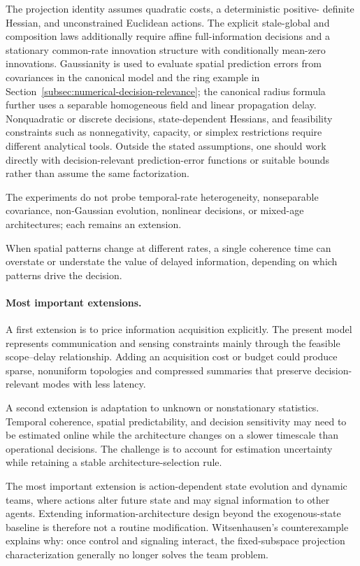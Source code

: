 \documentclass[11pt]{article}
\begin{document}
The projection identity assumes quadratic costs, a deterministic positive-
definite Hessian, and unconstrained Euclidean actions. The explicit stale-global
and composition laws additionally require affine full-information decisions
and a stationary common-rate innovation structure with conditionally
mean-zero innovations. Gaussianity is used to evaluate spatial prediction
errors from covariances in the canonical model and the ring example in
Section~\ref{subsec:numerical-decision-relevance};
the canonical radius formula further uses a separable homogeneous field
and linear propagation delay.
Nonquadratic or discrete decisions, state-dependent Hessians, and feasibility
constraints such as nonnegativity, capacity, or simplex restrictions require
different analytical tools. Outside the stated assumptions, one should work
directly with decision-relevant prediction-error functions or suitable bounds
rather than assume the same factorization.

The experiments do not probe temporal-rate heterogeneity, nonseparable
covariance, non-Gaussian evolution, nonlinear decisions, or mixed-age
architectures; each remains an extension.

When spatial patterns change at different rates, a single coherence time can
overstate or understate the value of delayed information, depending on which
patterns drive the decision.

\paragraph{Most important extensions.}
A first extension is to price information acquisition explicitly. The present
model represents communication and sensing constraints mainly through the
feasible scope--delay relationship. Adding an acquisition cost or budget could
produce sparse, nonuniform topologies and compressed summaries that preserve
decision-relevant modes with less latency.

A second extension is adaptation to unknown or nonstationary statistics.
Temporal coherence, spatial predictability, and decision sensitivity may need
to be estimated online while the architecture changes on a slower timescale
than operational decisions. The challenge is to account for estimation
uncertainty while retaining a stable architecture-selection rule.

The most important extension is action-dependent state evolution and dynamic
teams, where actions alter future state and may signal information to other
agents. Extending information-architecture design beyond the exogenous-state
baseline is therefore not a routine modification.
Witsenhausen's counterexample \cite{witsenhausen1968counterexample} explains
why: once control and signaling interact, the fixed-subspace projection
characterization generally no longer solves the team problem.
\end{document}

